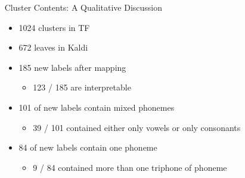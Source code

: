 \documentclass[final]{beamer} %
\newlength{\columnheight}
\begin{document}
\begin{frame}
\begin{columns}
\begin{column}{0.22\textwidth}
{      } %
    \end{column}



    
    \begin{column}{0.22\textwidth}
      \parbox[t][\columnheight]{.9\textwidth}{

        \vspace{.5cm}               %
        
        \begin{block}{\boxnumber Cluster Contents: A Qualitative Discussion}
          
          \begin{itemize}
          \item 1024 clusters in TF
          \item 672 leaves in Kaldi
            
          \item 185 new labels after mapping
            \begin{itemize}
            \item 123 / 185 are interpretable
            \end{itemize}
          \item 101 of new labels contain mixed phonemes
            \begin{itemize}
            \item 39 / 101 contained either only vowels or only consonants
            \end{itemize}
          \item 84 of new labels contain one phoneme
            \begin{itemize}
            \item 9 / 84 contained more than one triphone of phoneme
            \end{itemize}
          \end{itemize}
          

\end{block}}
\end{column}
\end{columns}
\end{frame}
\end{document}
